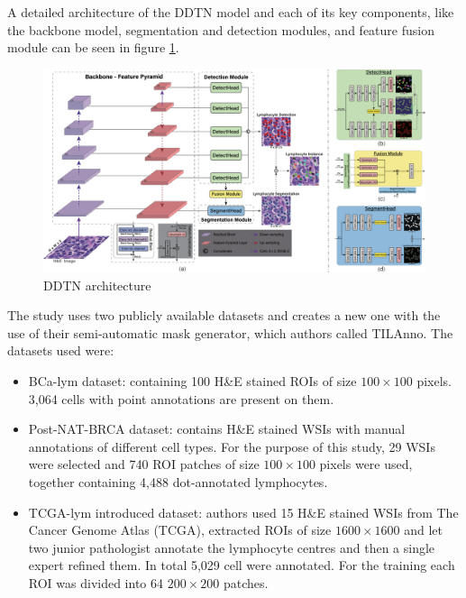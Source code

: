 A detailed architecture of the DDTN model and each of its key components, like the backbone model, segmentation and detection modules, and feature fusion module can be seen in figure \ref{fig:rw-ddtn-arch}.

\begin{figure}[H]
    \begin{centering}
    \includegraphics[width=14cm]{assets/images/rw-ddtn-architecture.jpg}
    \par\end{centering}
    \caption{DDTN architecture}
    \label{fig:rw-ddtn-arch}
\end{figure}

The study uses two publicly available datasets and creates a new one with the use of their semi-automatic mask generator, which authors called TILAnno. The datasets used were:

\begin{itemize}
    \item BCa-lym dataset: containing 100 H\&E stained ROIs of size $100\!\times\!100$ pixels. 3,064 cells with point annotations are present on them.
    \item Post-NAT-BRCA dataset: contains H\&E stained WSIs with manual annotations of different cell types. For the purpose of this study, 29 WSIs were selected and 740 ROI patches of size $100\!\times\!100$ pixels were used, together containing 4,488 dot-annotated lymphocytes.
    \item TCGA-lym introduced dataset: authors used 15 H\&E stained WSIs from The Cancer Genome Atlas (TCGA), extracted ROIs of size $1600\!\times\!1600$ and let two junior pathologist annotate the lymphocyte centres and then a single expert refined them. In total 5,029 cell were annotated. For the training each ROI was divided into 64 $200\!\times\!200$ patches.
\end{itemize}

